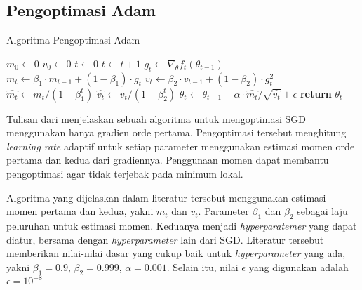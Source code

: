 \subsection{Pengoptimasi Adam}
\begin{algorithm}
  \caption{Algoritma Pengoptimasi Adam}\label{Adam}
  \begin{algorithmic}[1]
      \State $m_0 \gets 0$ 
      \State $v_0 \gets 0$ 
      \State $t \gets 0$ 
        \State $t \gets t+1$
        \State $g_t \gets \nabla_\theta f_t (\theta_{t-1})$
        \State $m_t \gets \beta_1 \cdot m_{t-1} + (1 - \beta_1) \cdot g_t$ 
        \State $v_t \gets \beta_2 \cdot v_{t-1} + (1-\beta_2) \cdot g_t^2$ 
        \State $\hat{m_t} \gets m_t/(1-\beta_1^t)$ 
        \State $\hat{v_t} \gets v_t/(1-\beta_2^t)$ 
        \State $\theta_t \gets \theta_{t-1} - \alpha \cdot \hat{m_t}/\sqrt{\hat{v_t}}+\epsilon$
      \EndWhile
      \State \textbf{return} $\theta_t$ 
    \EndFunction
  \end{algorithmic}
\end{algorithm}

Tulisan dari \textcite{ADAMKingma} menjelaskan sebuah algoritma untuk mengoptimasi SGD menggunakan hanya gradien orde pertama. Pengoptimasi tersebut menghitung \emph{learning rate} adaptif untuk setiap parameter menggunakan estimasi momen orde pertama dan kedua dari gradiennya. Penggunaan momen dapat membantu pengoptimasi agar tidak terjebak pada minimum lokal.

Algoritma yang dijelaskan dalam literatur tersebut menggunakan estimasi momen pertama dan kedua, yakni $m_t$ dan $v_t$. Parameter $\beta_1$ dan $\beta_2$ sebagai laju peluruhan untuk estimasi momen. Keduanya menjadi \emph{hyperparatemer} yang dapat diatur, bersama dengan \emph{hyperparameter} lain dari SGD. Literatur tersebut memberikan nilai-nilai dasar yang cukup baik untuk \emph{hyperparameter} yang ada, yakni $\beta_1 = 0.9$, $\beta_2 = 0.999$, $\alpha = 0.001$. Selain itu, nilai $\epsilon$ yang digunakan adalah $\epsilon = 10^{-8}$


